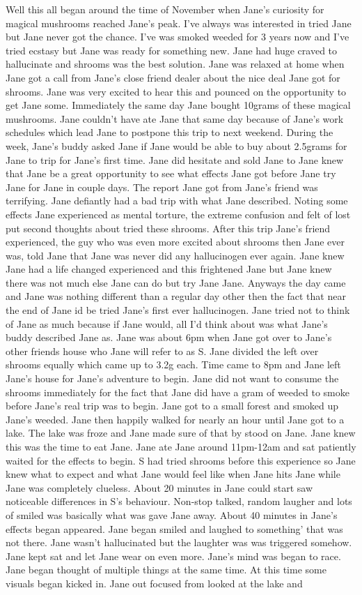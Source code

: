 \documentclass[12pt]{book}
\begin{document}
Well this all began around the time of November when Jane's curiosity for magical mushrooms reached Jane's peak. I've always was interested in tried Jane but Jane never got the chance. I've was smoked weeded for 3 years now and I've tried ecstasy but Jane was ready for something new. Jane had huge craved to hallucinate and shrooms was the best solution. Jane was relaxed at home when Jane got a call from Jane's close friend dealer about the nice deal Jane got for shrooms. Jane was very excited to hear this and pounced on the opportunity to get Jane some. Immediately the same day Jane bought 10grams of these magical mushrooms. Jane couldn't have ate Jane that same day because of Jane's work schedules which lead Jane to postpone this trip to next weekend. During the week, Jane's buddy asked Jane if Jane would be able to buy about 2.5grams for Jane to trip for Jane's first time. Jane did hesitate and sold Jane to Jane knew that Jane be a great opportunity to see what effects Jane got before Jane try Jane for Jane in couple days. The report Jane got from Jane's friend was terrifying. Jane defiantly had a bad trip with what Jane described. Noting some effects Jane experienced as mental torture, the extreme confusion and felt of lost put second thoughts about tried these shrooms. After this trip Jane's friend experienced, the guy who was even more excited about shrooms then Jane ever was, told Jane that Jane was never did any hallucinogen ever again. Jane knew Jane had a life changed experienced and this frightened Jane but Jane knew there was not much else Jane can do but try Jane Jane. Anyways the day came and Jane was nothing different than a regular day other then the fact that near the end of Jane id be tried Jane's first ever hallucinogen. Jane tried not to think of Jane as much because if Jane would, all I'd think about was what Jane's buddy described Jane as. Jane was about 6pm when Jane got over to Jane's other friends house who Jane will refer to as S. Jane divided the left over shrooms equally which came up to 3.2g each. Time came to 8pm and Jane left Jane's house for Jane's adventure to begin. Jane did not want to consume the shrooms immediately for the fact that Jane did have a gram of weeded to smoke before Jane's real trip was to begin. Jane got to a small forest and smoked up Jane's weeded. Jane then happily walked for nearly an hour until Jane got to a lake. The lake was froze and Jane made sure of that by stood on Jane. Jane knew this was the time to eat Jane. Jane ate Jane around 11pm-12am and sat patiently waited for the effects to begin. S had tried shrooms before this experience so Jane knew what to expect and what Jane would feel like when Jane hits Jane while Jane was completely clueless. About 20 minutes in Jane could start saw noticeable differences in S's behaviour. Non-stop talked, random laugher and lots of smiled was basically what was gave Jane away. About 40 minutes in Jane's effects began appeared. Jane began smiled and laughed to something' that was not there. Jane wasn't hallucinated but the laughter was was triggered somehow. Jane kept sat and let Jane wear on even more. Jane's mind was began to race. Jane began thought of multiple things at the same time. At this time some visuals began kicked in. Jane out focused from looked at the lake and 
\end{document}

